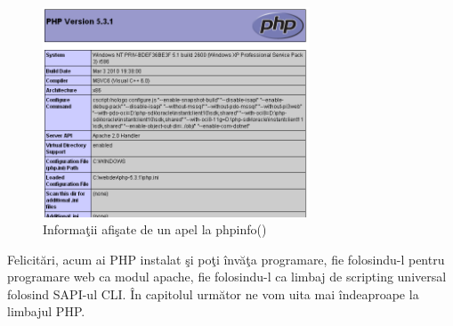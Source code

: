 \begin{figure}[h!]
  \centering
    \includegraphics[width=300px]{cap01/Screenshot-15.png}
  \caption{Informaţii afişate de un apel la phpinfo()}
  \label{img:php phpinfo}
\end{figure}

Felicitări, acum ai PHP instalat şi poţi învăţa programare, fie folosindu-l pentru programare web
ca modul apache, fie folosindu-l ca limbaj de scripting universal folosind SAPI-ul CLI. În capitolul următor ne vom uita mai îndeaproape la limbajul PHP.